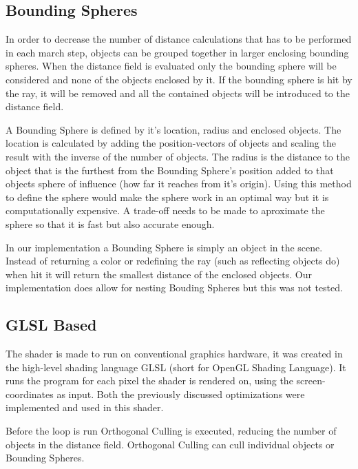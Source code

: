 		\subsection{Bounding Spheres}
			
			In order to decrease the number of distance calculations that has to be
			performed in each march step, objects can be grouped together in larger
			enclosing bounding spheres. When the distance field is evaluated only the
			bounding sphere will be considered and none of the objects enclosed by
			it. If the bounding sphere is hit by the ray, it will be removed and all
			the contained objects will be introduced to the distance field.
			
			A Bounding Sphere is defined by it's location, radius and enclosed
			objects. The location is calculated by adding the position-vectors
			of objects and scaling the result with the inverse of the number of
			objects. The radius is the distance to the object that is the
			furthest from the Bounding Sphere's position added to that objects
			sphere of influence (how far it reaches from it's origin). Using 
			this method to define the sphere would make the sphere work in an 
			optimal way but it is computationally expensive. A trade-off needs 
			to be made to aproximate the sphere so that it is fast but also 
			accurate enough.

			In our implementation a Bounding Sphere is simply an object in the
			scene. Instead of returning a color or redefining the ray (such 
			as reflecting objects do) when hit it will return the smallest 
			distance of the enclosed objects. Our implementation does allow for
			nesting Bouding Spheres but this was not tested.



		\subsection{GLSL Based}
	
			The shader is made to run on conventional graphics hardware, it was
			created in the high-level shading language GLSL (short for OpenGL
			Shading Language). It runs the program for each pixel the shader is
			rendered on, using the screen-coordinates as input. Both the 
			previously discussed optimizations were implemented and used in this
			shader.
			
			Before the loop is run Orthogonal Culling is executed, reducing the
			number of objects in the distance field. Orthogonal Culling can cull
			individual objects or Bounding Spheres. 
			
